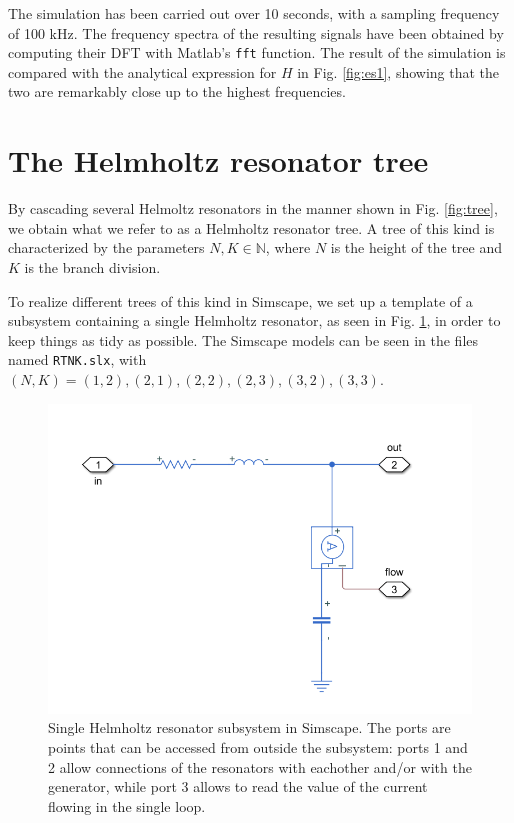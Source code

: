 \documentclass[a4paper]{article}
\begin{document}
The simulation has been carried out over 10 seconds, with a sampling frequency of 100 kHz. The frequency spectra of the resulting signals have been obtained by computing their DFT with Matlab's \texttt{fft} function. The result of the simulation is compared with the analytical expression for $H$ in Fig. \ref{fig:es1}, showing that the two are remarkably close up to the highest frequencies.




\section{The Helmholtz resonator tree}

By cascading several Helmoltz resonators in the manner shown in Fig. \ref{fig:tree}, we obtain what we refer to as a Helmholtz resonator tree. A tree of this kind is characterized by the parameters $N, K \in \mathbb{N}$, where $N$ is the height of the tree and $K$ is the branch division.

To realize different trees of this kind in Simscape, we set up a template of a subsystem containing a single Helmholtz resonator, as seen in Fig. \ref{fig:sims}, in order to keep things as tidy as possible. The Simscape models can be seen in the files named \texttt{RTNK.slx}, with $(N, K) = (1,2), (2,1), (2, 2), (2, 3), (3,2), (3,3)$.

\begin{figure}[h!]
	\centering
	\includegraphics[width=0.7\linewidth]{sims.png}
	\caption{Single Helmholtz resonator subsystem in Simscape. The ports are points that can be accessed from outside the subsystem: ports 1 and 2 allow connections of the resonators with eachother and/or with the generator, while port 3 allows to read the value of the current flowing in the single loop.}
	\label{fig:sims}
\end{figure}
\end{document}
